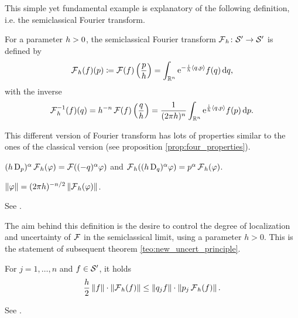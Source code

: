 This simple yet fundamental example is explanatory of the following definition, i.e. the semiclassical Fourier transform. 

\begin{defin}
For a parameter $h>0$, the semiclassical Fourier transform $\operatorname{\mathcal{F}}_{h}\colon\mathcal{S}'\to\mathcal{S}'$ is defined by
\[
\operatorname{\mathcal{F}}_{h}(f)(p)\coloneqq\operatorname{\mathcal{F}}(f)\left(\frac{p}{h}\right)=\int_{\mathbb{R}^{n}}\mathrm{e}^{-\frac{\mathrm{i}}{h}\left< q,p\right>}f(q)\mathop{}\!\mathrm{d} q,
\]
with the inverse 
\[
\operatorname{\mathcal{F}}_{h}^{-1}(f)(q)=h^{-n}\operatorname{\mathcal{F}}(f)\left(
\frac{q}{h}
\right)=\frac{1}{(2\pi h)^{n}}\int_{\mathbb{R}^{n}}\mathrm{e}^{\frac{\mathrm{i}}{h}\left< q,p\right>}f(p)\mathop{}\!\mathrm{d} p.
\]
\end{defin}

This different version of Fourier transform has lots of properties similar to the ones of the classical version (see proposition \ref{prop:four_properties}).

\begin{nprop}
\label{prop:properties_semicl_fourier}
\begin{compactenum}
\item $(h\operatorname{D}_{p})^{\alpha}\operatorname{\mathcal{F}}_{h}(\varphi)=\operatorname{\mathcal{F}}((-q)^{\alpha}\varphi)$ and $\operatorname{\mathcal{F}}_{h}((h\operatorname{D}_{q})^{\alpha}\varphi)=p^{\alpha}\operatorname{\mathcal{F}}_{h}(\varphi)$.
\item $\left\lVert \varphi\right\rVert=(2\pi h)^{-n/2}\left\lVert \operatorname{\mathcal{F}}_{h}(\varphi)\right\rVert$.
\end{compactenum}
\end{nprop}
\begin{prf}
See \cite{Zworski:semic}.
\end{prf}

The aim behind this definition is the desire to control the degree of localization and uncertainty of $\operatorname{\mathcal{F}}$ in the semiclassical limit, using a parameter $h>0$. This is the statement of subsequent theorem \ref{teo:new_uncert_principle}.


\begin{nteo}
\label{teo:new_uncert_principle}
For $j=1,\ldots,n$ and $f\in\mathcal{S}'$, it holds
\[
\frac{h}{2}\left\lVert f\right\rVert\cdot\left\lVert \operatorname{\mathcal{F}}_{h}(f)\right\rVert\leq \left\lVert q_{j}f\right\rVert\cdot \left\lVert p_{j}\operatorname{\mathcal{F}}_{h}(f)\right\rVert.
\]
\end{nteo}
\begin{prf}
See \cite{Zworski:semic}.%
\end{prf}

